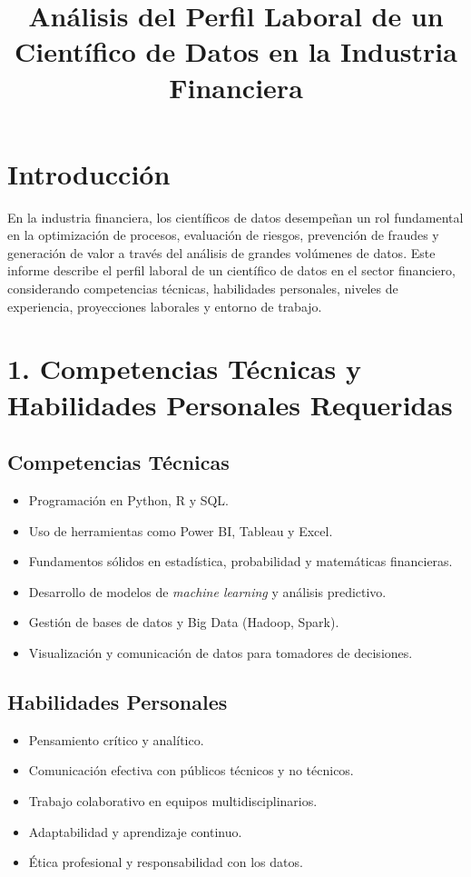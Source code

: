 \documentclass[12pt]{article}
\title{Análisis del Perfil Laboral de un Científico de Datos en la Industria Financiera}
\author{}
\date{}
\begin{document}
\maketitle

\section*{Introducción}

En la industria financiera, los científicos de datos desempeñan un rol fundamental en la optimización de procesos, evaluación de riesgos, prevención de fraudes y generación de valor a través del análisis de grandes volúmenes de datos. Este informe describe el perfil laboral de un científico de datos en el sector financiero, considerando competencias técnicas, habilidades personales, niveles de experiencia, proyecciones laborales y entorno de trabajo.

\section*{1. Competencias Técnicas y Habilidades Personales Requeridas}

\subsection*{Competencias Técnicas}
\begin{itemize}
    \item Programación en Python, R y SQL.
    \item Uso de herramientas como Power BI, Tableau y Excel.
    \item Fundamentos sólidos en estadística, probabilidad y matemáticas financieras.
    \item Desarrollo de modelos de \textit{machine learning} y análisis predictivo.
    \item Gestión de bases de datos y Big Data (Hadoop, Spark).
    \item Visualización y comunicación de datos para tomadores de decisiones.
\end{itemize}

\subsection*{Habilidades Personales}
\begin{itemize}
    \item Pensamiento crítico y analítico.
    \item Comunicación efectiva con públicos técnicos y no técnicos.
    \item Trabajo colaborativo en equipos multidisciplinarios.
    \item Adaptabilidad y aprendizaje continuo.
    \item Ética profesional y responsabilidad con los datos.
\end{itemize}
\end{document}
